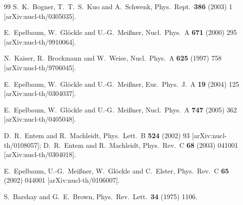 \documentclass[a4paper,fleqn]{scrartcl}
\begin{document}
{\begin{thebibliography}{99}
  S.~K.~Bogner, T.~T.~S.~Kuo and A.~Schwenk,
  Phys.\ Rept.\  {\bf 386} (2003) 1
  [arXiv:nucl-th/0305035].

  E.~Epelbaum, W.~Gl\"ockle and U.-G.~Mei\ss ner,
  Nucl.\ Phys.\  A {\bf 671} (2000) 295
  [arXiv:nucl-th/9910064].

  N.~Kaiser, R.~Brockmann and W.~Weise,
  Nucl.\ Phys.\  A {\bf 625} (1997) 758
  [arXiv:nucl-th/9706045].

  E.~Epelbaum, W.~Gl\"ockle and U.-G.~Mei\ss ner,
  Eur.\ Phys.\ J.\  A {\bf 19} (2004) 125
  [arXiv:nucl-th/0304037].

  E.~Epelbaum, W.~Gl\"ockle and U.-G.~Mei\ss ner,
  Nucl.\ Phys.\  A {\bf 747} (2005) 362
  [arXiv:nucl-th/0405048].


  D.~R.~Entem and R.~Machleidt,
  Phys.\ Lett.\  B {\bf 524} (2002) 93
  [arXiv:nucl-th/0108057];
 D.~R.~Entem and R.~Machleidt,
  Phys.\ Rev.\  C {\bf 68} (2003) 041001
  [arXiv:nucl-th/0304018].

  E.~Epelbaum, U.-G.~Mei\ss ner, W.~Gl\"ockle and C.~Elster,
  Phys.\ Rev.\  C {\bf 65} (2002) 044001
  [arXiv:nucl-th/0106007].

  S.~Barshay and G.~E.~Brown,
  Phys.\ Rev.\ Lett.\  {\bf 34} (1975) 1106.


\end{thebibliography}}
\end{document}
